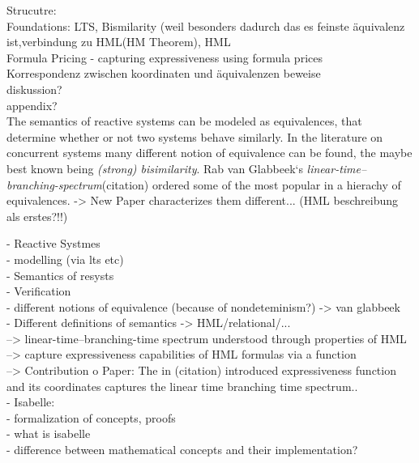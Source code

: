 \begin{isabellebody}
\begin{isamarkuptext}
Strucutre:\\
Foundations: LTS, Bismilarity (weil besonders dadurch das es feinste äquivalenz ist,verbindung zu HML(HM Theorem), HML \\
Formula Pricing - capturing expressiveness using formula prices \\
Korrespondenz zwischen koordinaten und äquivalenzen beweise\\
diskussion?\\
appendix?\\

The semantics of reactive systems can be modeled as equivalences, that determine whether or not two systems behave similarly.
In the literature on concurrent systems many different notion of equivalence can be found, the maybe best known being \emph{(strong) bisimilarity}.
Rab van Glabbeek`s \emph{linear-time--branching-spectrum}(citation) ordered some of the most popular in a hierachy of equivalences.
-> New Paper characterizes them different... (HML beschreibung als erstes?!!)


- Reactive Systmes \\
  - modelling (via lts etc) \\
  - Semantics of resysts \\
    - Verification \\
    - different notions of equivalence (because of nondeteminism?) -> van glabbeek \\
    - Different definitions of semantics -> HML/relational/... \\
 --> linear-time--branching-time spectrum understood through properties of HML \\
  --> capture expressiveness capabilities of HML formulas via a function \\
--> Contribution o Paper: The in (citation) introduced expressiveness function 
and its coordinates captures the linear time branching time spectrum.. \\
- Isabelle:\\
  - formalization of concepts, proofs \\
  - what is isabelle \\
  - difference between mathematical concepts and their implementation? \\%
\end{isamarkuptext}\isamarkuptrue%
%
\isadelimtheory
%
\endisadelimtheory
%
\isatagtheory
%
\endisatagtheory
{\isafoldtheory}%
%
\isadelimtheory
%
\endisadelimtheory
%
\end{isabellebody}%
